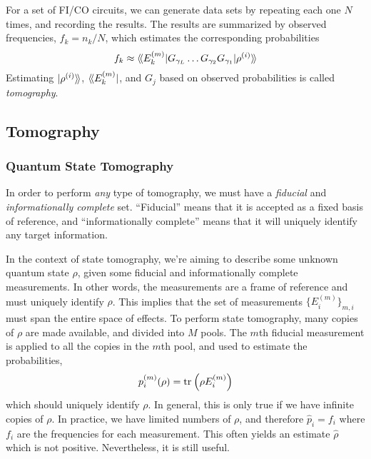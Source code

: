 For a set of FI/CO circuits, we can generate data sets by repeating each one $N$ times, and
recording the results. The results are summarized by observed frequencies, $f_k = n_k / N$, which
estimates the corresponding probabilities
\begin{equation} \label{eq:observed_freq}
    f_k \approx \langle\!\braket{E_k^{(m)} | G_{\gamma_L} \dots G_{\gamma_2} G_{\gamma_1} | \rho^{(i)}}\!\rangle
\end{equation}
Estimating $\ket{\rho^{(i)}}\!\rangle$, $\langle\!\bra{E_k^{(m)}}$, and $G_j$ based on observed
probabilities is called \textit{tomography}.

\subsection{Tomography}


\subsubsection{Quantum State Tomography}

In order to perform \textit{any} type of tomography, we must have a \textit{fiducial} and
\textit{informationally complete} set. ``Fiducial'' means that it is accepted as a fixed basis of
reference, and ``informationally complete'' means that it will uniquely identify any target
information. 

In the context of state tomography, we're aiming to describe some unknown quantum state $\rho$,
given some fiducial and informationally complete measurements. In other words, the measurements are
a frame of reference and must uniquely identify $\rho$. This implies that the set of measurements
$\{E_i^{(m)}\}_{m,i}$ must span the entire space of effects. To perform state tomography, many
copies of $\rho$ are made available, and divided into $M$ pools. The $m$th fiducial measurement is
applied to all the copies in the $m$th pool, and used to estimate the probabilities,
\begin{equation}
    p_i^{(m)} (\rho) = \text{tr}_{}\left(\rho E_i^{(m)}\right)
\end{equation}
which should uniquely identify $\rho$. In general, this is only true if we have infinite copies of
$\rho$. In practice, we have limited numbers of $\rho$, and therefore $\hat{p}_i = f_i$ where $f_i$
are the frequencies for each measurement. This often yields an estimate $\hat{\rho}$ which is not
positive. Nevertheless, it is still useful.

